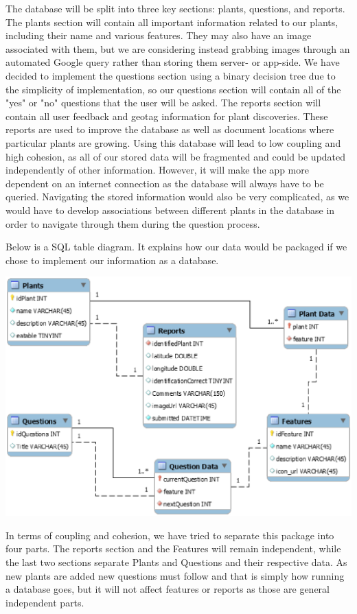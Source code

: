 \documentclass[a4paper]{article}
\begin{document}
The database will be split into three key sections: plants, questions, and reports. The plants section will contain all important information related to our plants, including their name and various features. They may also have an image associated with them, but we are considering instead grabbing images through an automated Google query rather than storing them server- or app-side. We have decided to implement the questions section using a binary decision tree due to the simplicity of implementation, so our questions section will contain all of the "yes" or "no" questions that the user will be asked. The reports section will contain all user feedback and geotag information for plant discoveries. These reports are used to improve the database as well as document locations where particular plants are growing. Using this database will lead to low coupling and high cohesion, as all of our stored data will be fragmented and could be updated independently of other information. However, it will make the app more dependent on an internet connection as the database will always have to be queried. Navigating the stored information would also be very complicated, as we would have to develop associations between different plants in the database in order to navigate through them during the question process.

Below is a SQL table diagram. It explains how our data would be packaged if we chose to implement our information as a database.

\begin{center}\includegraphics[scale=.6]{DatabaseDesign.eps}\end{center}

In terms of coupling and cohesion, we have tried to separate this package into four parts. The reports section and the Features will remain independent, while the last two sections separate Plants and Questions and their respective data. As new plants are added new questions must follow and that is simply how running a database goes, but it will not affect features or reports as those are general independent parts.
\end{document}
